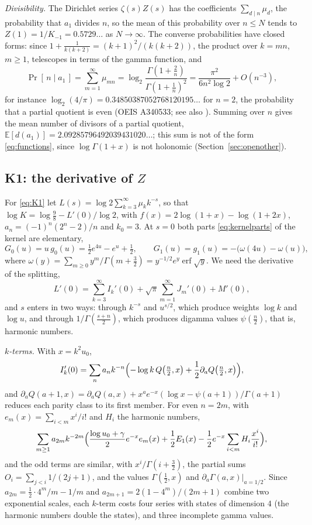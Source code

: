 \documentclass[11pt,reqno]{amsart}
\theoremstyle{definition}
\theoremstyle{remark}
\begin{document}
\emph{Divisibility.} The Dirichlet series $\zeta(s)Z(s)$ has the coefficients $\sum_{d\mid n}\mu_d$, the probability
that $a_1$ divides $n$, so the mean of this probability over $n \le N$ tends to $Z(1) = 1/K_{-1} = 0.5729\ldots$ as
$N \to \infty$. The converse probabilities have closed forms: since $1 + \frac1{k(k+2)} = (k+1)^2/(k(k+2))$, the
product over $k = mn$, $m \ge 1$, telescopes in terms of the gamma function, and
\[
  \Pr[\,n \mid a_1\,] = \sum_{m=1}^{\infty}\mu_{mn} = \log_2\frac{\Gamma(1+\frac2n)}{\Gamma(1+\frac1n)^2}
  = \frac{\pi^2}{6n^2\log2} + O(n^{-3}),
\]
for instance $\log_2(4/\pi) = 0.34850387052768120195\ldots$ for $n = 2$, the probability that a partial quotient is
even (OEIS A340533; see also \cite{Nol90}). Summing over $n$ gives the mean number of divisors of a partial quotient,
$\mathbb E[d(a_1)] = 2.09285796492039431020\ldots$; this sum is not of the form \eqref{eq:functions}, since
$\log\Gamma(1+x)$ is not holonomic (Section~\ref{sec:openother}).

\subsection{K1: the derivative of $Z$}\label{sec:Zprime}
For \eqref{eq:K1} let $L(s) = \log 2\sum_{k=3}^{\infty}\mu_kk^{-s}$, so that $\log K = \log\frac98 - L'(0)/\log 2$,
with $f(x) = 2\log(1+x) - \log(1+2x)$, $a_n = (-1)^n(2^n - 2)/n$ and $k_0 = 3$. At $s = 0$ both parts
\eqref{eq:kernelparts} of the kernel are elementary,
\[
  G_0(u) = u\,g_0(u) = \tfrac12e^{4u} - e^u + \tfrac12, \qquad G_1(u) = g_1(u) = -\bigl(\omega(4u) - \omega(u)\bigr),
\]
where $\omega(y) = \sum_{m\ge0}y^m/\Gamma(m+\frac32) = y^{-1/2}e^y\operatorname{erf}\sqrt y$. We need the derivative of
the splitting,
\[
  L'(0) = \sum_{k=3}^{\infty}I_k'(0) + \sqrt\pi\sum_{m=1}^{\infty}J_m'(0) + M'(0),
\]
and $s$ enters in two ways: through $k^{-s}$ and $u^{s/2}$, which produce weights $\log k$ and $\log u$, and through
$1/\Gamma(\frac{s+n}2)$, which produces digamma values $\psi(\frac n2)$, that is, harmonic numbers.

\emph{$k$-terms.} With $x = k^2u_0$,
\[
  I_k'(0) = \sum_na_nk^{-n}\Bigl(-\log k\,Q\bigl(\tfrac n2,x\bigr) + \frac12\partial_aQ\bigl(\tfrac n2,x\bigr)\Bigr),
\]
and $\partial_aQ(a+1,x) = \partial_aQ(a,x) + x^ae^{-x}(\log x - \psi(a+1))/\Gamma(a+1)$ reduces each parity class to
its first member. For even $n = 2m$, with $e_m(x) = \sum_{i<m}x^i/i!$ and $H_i$ the harmonic numbers,
\[
  \sum_{m\ge1}a_{2m}k^{-2m}\Bigl(\frac{\log u_0 + \gamma}2e^{-x}e_m(x) + \frac12E_1(x)
  - \frac12e^{-x}\sum_{i<m}H_i\frac{x^i}{i!}\Bigr),
\]
and the odd terms are similar, with $x^i/\Gamma(i+\frac32)$, the partial sums $O_i = \sum_{j<i}1/(2j+1)$, and the
values $\Gamma(\frac12,x)$ and $\partial_a\Gamma(a,x)|_{a=1/2}$. Since $a_{2m} = \frac12\cdot4^m/m - 1/m$ and
$a_{2m+1} = 2(1 - 4^m)/(2m+1)$ combine two exponential scales, each $k$-term costs four series with states of
dimension $4$ (the harmonic numbers double the states), and three incomplete gamma values.
\end{document}
